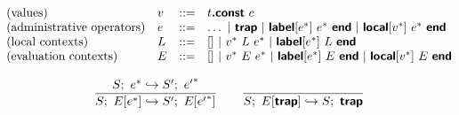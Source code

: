 \documentclass[a4paper]{scrartcl}
\newcommand\evalto{\hookrightarrow}
\newcommand\K[1]{\ensuremath{\textsf{#1}}}
\newcommand\KK[1]{\ensuremath{\K{\textbf{#1}}}}
\begin{document}
$$
\begin{array}{@{}llcl@{}}
\text{(values)} & v &::=&
  t\KK{.const}~c \\
\text{(administrative operators)} & e &::=&
  \dots ~|~
  \KK{trap} ~|~
  \KK{label}[e^\ast]~e^\ast~\KK{end} ~|~
  \KK{local}[v^\ast]~e^\ast~\KK{end} \\
\text{(local contexts)} & L &::=&
  [] ~|~
  v^\ast~L~e^\ast ~|~
  \KK{label}[e^\ast]~L~\KK{end} \\
\text{(evaluation contexts)} & E &::=&
  [] ~|~
  v^\ast~E~e^\ast ~|~
  \KK{label}[e^\ast]~E~\KK{end} ~|~
  \KK{local}[v^\ast]~E~\KK{end} \\
\end{array}
$$

$$
\frac{
  S;~e^\ast \evalto S';~{e'}^\ast
}{
  S;~E[e^\ast] \evalto S';~E[{e'}^\ast]
}
\qquad
\frac{
}{
  S;~E[\KK{trap}] \evalto S;~\KK{trap}
}
$$
\end{document}
